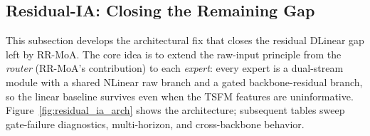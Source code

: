 \documentclass{article}
\begin{document}
\subsection{Residual-IA: Closing the Remaining Gap}
\label{app:gate_pathology}

This subsection develops the architectural fix that closes the residual DLinear gap left by RR-MoA. The core idea is to extend the raw-input principle from the \emph{router} (RR-MoA's contribution) to each \emph{expert}: every expert is a dual-stream module with a shared NLinear raw branch and a gated backbone-residual branch, so the linear baseline survives even when the TSFM features are uninformative. Figure~\ref{fig:residual_ia_arch} shows the architecture; subsequent tables sweep gate-failure diagnostics, multi-horizon, and cross-backbone behavior.

\end{document}
